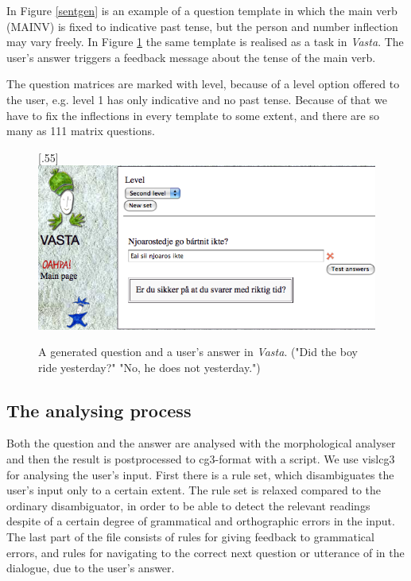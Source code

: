 \documentclass[11pt]{article}
\begin{document}
In Figure \ref{sentgen} is an example of a question template in which the main verb (MAINV) is fixed to indicative past tense, but the person and number inflection may vary freely. In Figure \ref{vastasent} the same template is realised as a task in \textit{Vasta}. The user's answer triggers a feedback message about the tense of the main verb. 

The question matrices are marked with level, because of a level option offered to the user, e.g. level 1 has only indicative and no past tense. Because of that we have to fix the inflections in every template to some extent, and there are so many as 111 matrix questions. \\

\begin{figure}[htbp]
\begin{center}
\scalebox{.55}[.55]{\includegraphics{presentation/img/newvasta.png}}\\
\caption{A generated question and a user's answer in \textit{Vasta}. ("Did the boy ride yesterday?" "No, he does not yesterday.")}
\label{vastasent}
\end{center}
\end{figure}
 
\subsection{The analysing process} 
Both the question and the answer are analysed with the morphological analyser and then the result is postprocessed to cg3-format with a script.
We use vislcg3 for analysing the user's input. First there is a rule set, which disambiguates the user's input only to a certain extent. The rule set is relaxed compared to the ordinary disambiguator, in order to be able to detect the relevant readings despite of a certain degree of grammatical and orthographic errors in the input. The last part of the file consists of rules for giving feedback to grammatical errors, and rules for navigating to the correct next question or utterance of in the dialogue, due to the user's answer.  
\end{document}
